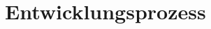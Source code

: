 \documentclass[a4paper,titlepage,12pt,ngerman]{scrbook}
\begin{document}

\tableofcontents



\chapter{Entwicklungsprozess}
%

%
%
%

%

%

%

%
\end{document}

